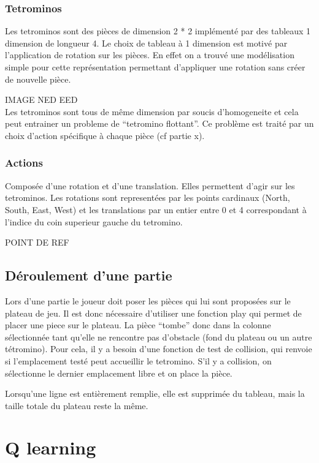 \documentclass{article}
\begin{document}
\subsubsection{Tetrominos}
Les tetrominos sont des pièces de dimension  2 * 2 implémenté par des tableaux
1 dimension de longueur 4.
Le choix de tableau  à 1 dimension est motivé par l'application de rotation
sur les pièces. En effet on a trouvé une modélisation simple pour cette
représentation permettant d'appliquer une rotation sans créer de nouvelle pièce.

IMAGE NED EED\\
Les tetrominos sont tous de même dimension par soucis d'homogeneite et cela
peut entrainer un probleme de ``tetromino flottant''. Ce problème est traité par
un choix d'action spécifique à chaque pièce (cf partie x).


\subsubsection{Actions}
Composée d'une rotation et d'une translation. Elles permettent d'agir sur les
tetrominos. Les rotations sont representées par les points cardinaux
(North, South, East, West) et les translations par un entier entre 0 et 4
correspondant à l'indice du coin superieur gauche du tetromino.

POINT DE REF

\subsection{D\'eroulement d'une partie}
Lors d'une partie le joueur doit poser les pièces qui lui sont proposées sur
le plateau de jeu. Il est donc nécessaire d'utiliser une fonction play qui
permet de placer une piece sur le plateau. La pièce ``tombe'' donc dans la
colonne sélectionnée tant qu'elle ne rencontre pas d'obstacle (fond du plateau
ou un autre tétromino). Pour cela, il y a besoin d'une fonction de test de
collision, qui renvoie si l'emplacement testé peut accueillir le tetromino.
S'il y a collision, on sélectionne le dernier emplacement libre et on place la
pièce.

Lorsqu'une ligne est entièrement remplie, elle est supprimée du tableau, mais
la taille totale du plateau reste la même.

\section{Q learning}
\end{document}
